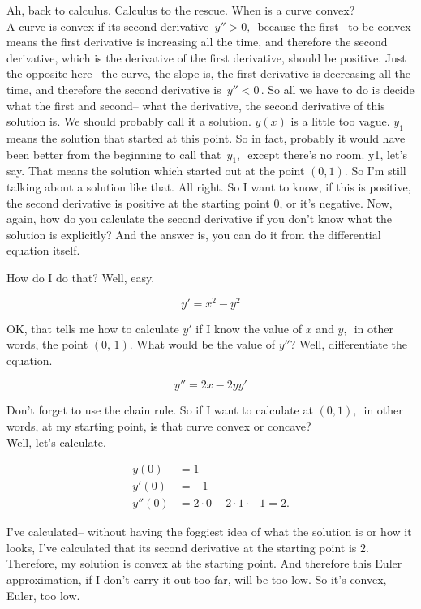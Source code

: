 Ah, back to calculus.
Calculus to the rescue.
When is a curve convex? \\
A curve is convex if its second derivative $\, y'' > 0,\, $
because the first-- to be convex means the first derivative is increasing
all the time, and therefore the second derivative,
which is the derivative of the first derivative, should be positive.
Just the opposite here-- the curve,
the slope is, the first derivative is decreasing all the time, and therefore the second derivative is $\, y'' < 0 \,$. 
So all we have to do is decide what the first and second--
what the derivative, the second derivative of this solution is.
We should probably call it a solution.
$y(x)$ is a little too vague.
$y_1$ means the solution that started at this point.
So in fact, probably it would have
been better from the beginning to call that $\, y_1, \,$ except there's no room.
y1, let's say.
That means the solution which started out at the point $(0, 1)$.
So I'm still talking about a solution like that.
All right.
So I want to know, if this is positive,
the second derivative is positive at the starting point
$0$, or it's negative.
Now, again, how do you calculate the second derivative if you don't know what the solution is explicitly?
And the answer is, you can do it from the differential equation itself.

How do I do that?
Well, easy.

\begin{equation*}
  y' = x^2 - y^2
\end{equation*}

OK, that tells me how to calculate $y'$
if I know the value of $x$ and $y,\,$ in other words, the point $(0,\, 1)$.
What would be the value of $y''$?
Well, differentiate the equation.

\begin{equation*}
  y'' = 2x - 2yy' 
\end{equation*}

Don't forget to use the chain rule.
So if I want to calculate at $(0, 1),\,$ in other words, at my starting point,
is that curve convex or concave?\\
Well, let's calculate.

\begin{align*}
  y(0) &= 1 \\
  y'(0) & = -1 \\
  y''(0) & = 2 \cdot 0 - 2 \cdot 1 \cdot -1 = 2. 
\end{align*}

I've calculated-- without having the foggiest idea of what the solution is or how it looks, I've
calculated that its second derivative
at the starting point is $2$.
Therefore, my solution is convex at the starting point.
And therefore this Euler approximation,
if I don't carry it out too far, will be too low.
So it's convex, Euler, too low.

